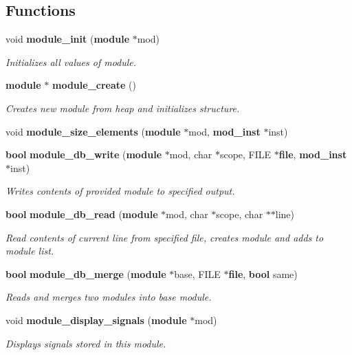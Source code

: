 \subsection*{Functions}
\begin{CompactItemize}
\item 
void {\bf module\_\-init} ({\bf module} $\ast$mod)
\begin{CompactList}\small\item\em Initializes all values of module.\item\end{CompactList}\item 
{\bf module} $\ast$ {\bf module\_\-create} ()
\begin{CompactList}\small\item\em Creates new module from heap and initializes structure.\item\end{CompactList}\item 
void {\bf module\_\-size\_\-elements} ({\bf module} $\ast$mod, {\bf mod\_\-inst} $\ast$inst)
\item 
{\bf bool} {\bf module\_\-db\_\-write} ({\bf module} $\ast$mod, char $\ast$scope, FILE $\ast${\bf file}, {\bf mod\_\-inst} $\ast$inst)
\begin{CompactList}\small\item\em Writes contents of provided module to specified output.\item\end{CompactList}\item 
{\bf bool} {\bf module\_\-db\_\-read} ({\bf module} $\ast$mod, char $\ast$scope, char $\ast$$\ast$line)
\begin{CompactList}\small\item\em Read contents of current line from specified file, creates module and adds to module list.\item\end{CompactList}\item 
{\bf bool} {\bf module\_\-db\_\-merge} ({\bf module} $\ast$base, FILE $\ast${\bf file}, {\bf bool} same)
\begin{CompactList}\small\item\em Reads and merges two modules into base module.\item\end{CompactList}\item 
void {\bf module\_\-display\_\-signals} ({\bf module} $\ast$mod)
\begin{CompactList}\small\item\em Displays signals stored in this module.\item\end{CompactList}\item 
$$
\end{CompactItemize}
